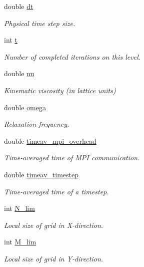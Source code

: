 \begin{DoxyCompactItemize}
double \hyperlink{class_grid_obj_afd504b39f12eb0a237bc6313de94e094}{dt}
\begin{DoxyCompactList}\small\item\em Physical time step size. \end{DoxyCompactList}\item 
int \hyperlink{class_grid_obj_a783b18a053e244ae7b7b436ab21c0592}{t}
\begin{DoxyCompactList}\small\item\em Number of completed iterations on this level. \end{DoxyCompactList}\item 
double \hyperlink{class_grid_obj_a755f85eb5480d959211e00937a478ae9}{nu}
\begin{DoxyCompactList}\small\item\em Kinematic viscosity (in lattice units) \end{DoxyCompactList}\item 
double \hyperlink{class_grid_obj_a21461e5d39c5ae83ae42170c829e9da3}{omega}
\begin{DoxyCompactList}\small\item\em Relaxation frequency. \end{DoxyCompactList}\item 
double \hyperlink{class_grid_obj_a147cfb80b653ca4432432e8185cf38ef}{timeav\+\_\+mpi\+\_\+overhead}
\begin{DoxyCompactList}\small\item\em Time-\/averaged time of M\+PI communication. \end{DoxyCompactList}\item 
double \hyperlink{class_grid_obj_a2ad670e6b9bdd28b5060397800170310}{timeav\+\_\+timestep}
\begin{DoxyCompactList}\small\item\em Time-\/averaged time of a timestep. \end{DoxyCompactList}\item 
int \hyperlink{class_grid_obj_a5eb35752a7c0741510975d9ee6aa3ce1}{N\+\_\+lim}
\begin{DoxyCompactList}\small\item\em Local size of grid in X-\/direction. \end{DoxyCompactList}\item 
int \hyperlink{class_grid_obj_a01d3f362634c896ecdb80f0e6304c12f}{M\+\_\+lim}
\begin{DoxyCompactList}\small\item\em Local size of grid in Y-\/direction. \end{DoxyCompactList}\item 

\end{DoxyCompactItemize}
